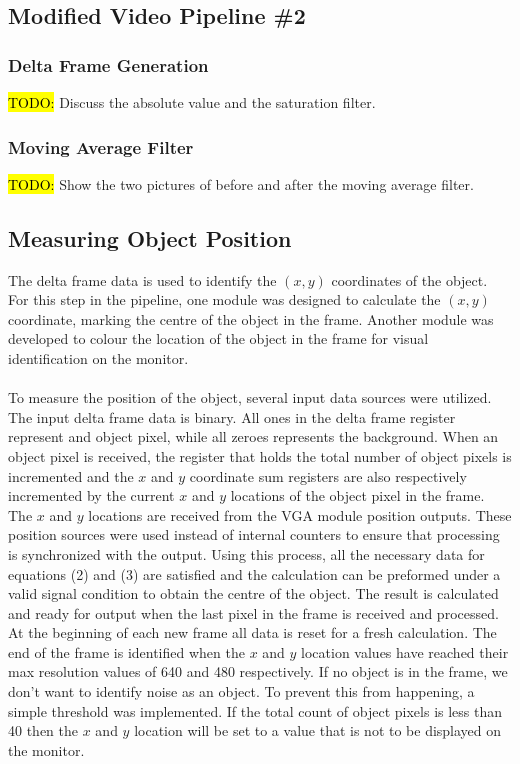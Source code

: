 \documentclass[11pt]{article} %
\begin{document}
\subsection{Modified Video Pipeline \#2}
\subsubsection{Delta Frame Generation}
\hl{TODO:} Discuss the absolute value and the saturation filter.
\subsubsection{Moving Average Filter}
\hl{TODO:} Show the two pictures of before and after the moving average filter.
\subsection{Measuring Object Position}
The delta frame data is used to identify the $(x,y)$ coordinates of the object. For this step in the pipeline, one module was designed to calculate the $(x,y)$ coordinate, marking the centre of the object in the frame. Another module was developed to colour the location of the object in the frame for visual identification on the monitor. \\\\
To measure the position of the object, several input data sources were utilized. The input delta frame data is binary. All ones in the delta frame register represent and object pixel, while all zeroes represents the background. When an object pixel is received, the register that holds the total number of object pixels is incremented and the $x$ and $y$ coordinate sum registers are also respectively incremented by the current $x$ and $y$ locations of the object pixel in the frame. The $x$ and $y$ locations are received from the VGA module position outputs. These position sources were used instead of internal counters to ensure that processing is synchronized with the output. Using this process, all the necessary data for equations (2) and (3) are satisfied and the calculation can be preformed under a valid signal condition to obtain the centre of the object. The result is calculated and ready for output when the last pixel in the frame is received and processed. At the beginning of each new frame all data is reset for a fresh calculation. The end of the frame is identified when the $x$ and $y$ location values have reached their max resolution values of 640 and 480 respectively. If no object is in the frame, we don't want to identify noise as an object. To prevent this from happening, a simple threshold was implemented. If the total count of object pixels is less than 40 then the $x$ and $y$ location will be set to a value that is not to be displayed on the monitor. \\\\
\end{document}
